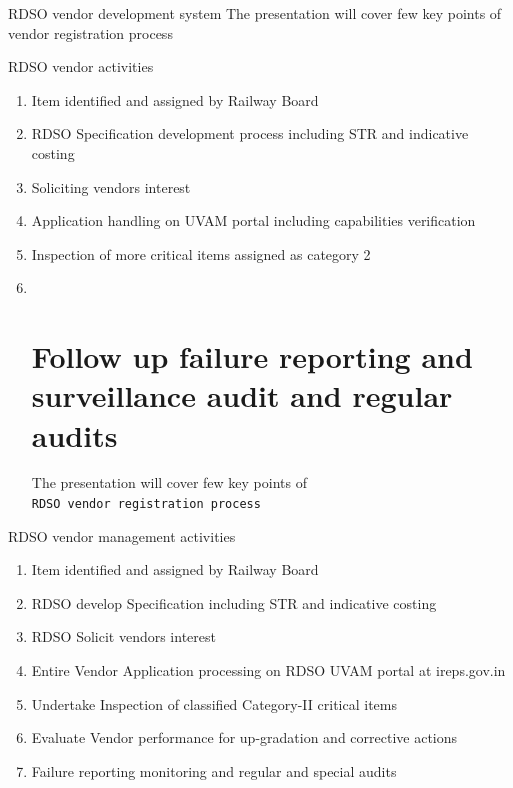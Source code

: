 \documentclass[
  10pt,
  ignorenonframetext,
  aspectratio=43,
]{beamer}
\providecommand{\tightlist}{%
  \setlength{\itemsep}{0pt}\setlength{\parskip}{0pt}}
\begin{document}
\begin{frame}[fragile]{RDSO vendor development system}
The presentation will cover few key points of vendor registration
process

\begin{block}{RDSO vendor activities}
\protect\hypertarget{rdso-vendor-activities}{}
\begin{enumerate}
\item
  Item identified and assigned by Railway Board
\item
  RDSO Specification development process including STR and indicative
  costing
\item
  Soliciting vendors interest
\item
  Application handling on UVAM portal including capabilities
  verification
\item
  Inspection of more critical items assigned as category 2
\item ~
  \hypertarget{follow-up-failure-reporting-and-surveillance-audit-and-regular-audits}{%
  \section{Follow up failure reporting and surveillance audit and
  regular
  audits}\label{follow-up-failure-reporting-and-surveillance-audit-and-regular-audits}}

  The presentation will cover few key points of
  \texttt{RDSO\ vendor\ registration\ process}
\end{enumerate}
\end{block}

\begin{block}{RDSO vendor management activities}
\protect\hypertarget{rdso-vendor-management-activities}{}
\begin{enumerate}
\tightlist
\item
  Item identified and assigned by Railway Board
\item
  RDSO develop Specification including STR and indicative costing
\item
  RDSO Solicit vendors interest
\item
  Entire Vendor Application processing on RDSO UVAM portal at
  ireps.gov.in
\item
  Undertake Inspection of classified Category-II critical items
\item
  Evaluate Vendor performance for up-gradation and corrective actions
\item
  Failure reporting monitoring and regular and special audits
\end{enumerate}
\end{block}
\end{frame}
\end{document}
